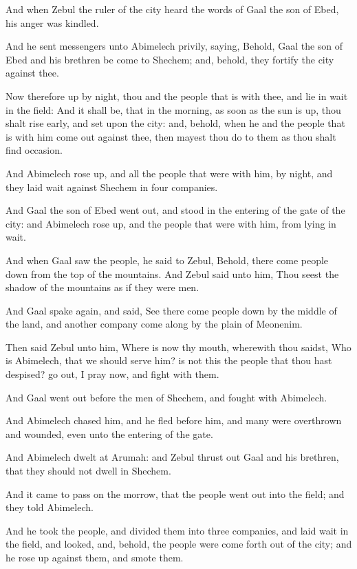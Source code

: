 \Verse And when Zebul the ruler of the city heard the words of Gaal the son of Ebed, his anger was kindled.

\Verse And he sent messengers unto Abimelech privily, saying, Behold, Gaal the son of Ebed and his brethren be come to Shechem; and, behold, they fortify the city against thee.

\Verse Now therefore up by night, thou and the people that is with thee, and lie in wait in the field: \Verse And it shall be, that in the morning, as soon as the sun is up, thou shalt rise early, and set upon the city: and, behold, when he and the people that is with him come out against thee, then mayest thou do to them as thou shalt find occasion.

\Verse And Abimelech rose up, and all the people that were with him, by night, and they laid wait against Shechem in four companies.

\Verse And Gaal the son of Ebed went out, and stood in the entering of the gate of the city: and Abimelech rose up, and the people that were with him, from lying in wait.

\Verse And when Gaal saw the people, he said to Zebul, Behold, there come people down from the top of the mountains. And Zebul said unto him, Thou seest the shadow of the mountains as if they were men.

\Verse And Gaal spake again, and said, See there come people down by the middle of the land, and another company come along by the plain of Meonenim.

\Verse Then said Zebul unto him, Where is now thy mouth, wherewith thou saidst, Who is Abimelech, that we should serve him? is not this the people that thou hast despised? go out, I pray now, and fight with them.

\Verse And Gaal went out before the men of Shechem, and fought with Abimelech.

\Verse And Abimelech chased him, and he fled before him, and many were overthrown and wounded, even unto the entering of the gate.

\Verse And Abimelech dwelt at Arumah: and Zebul thrust out Gaal and his brethren, that they should not dwell in Shechem.

\Verse And it came to pass on the morrow, that the people went out into the field; and they told Abimelech.

\Verse And he took the people, and divided them into three companies, and laid wait in the field, and looked, and, behold, the people were come forth out of the city; and he rose up against them, and smote them.

